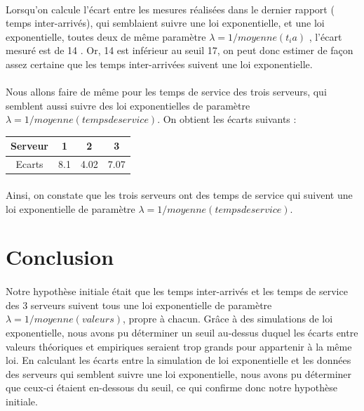 \documentclass{article}
\begin{document}
\paragraph{}
Lorsqu’on calcule l’écart entre les mesures réalisées dans le dernier rapport ( temps inter-arrivés), qui semblaient suivre une loi exponentielle,  et une loi exponentielle, toutes deux de même paramètre $ \lambda = 1/moyenne(t_ia)$ , l’écart mesuré est de 14 . Or, 14 est inférieur au seuil 17, on peut donc estimer de façon assez certaine que les temps inter-arrivées suivent une loi exponentielle.

\paragraph{}
Nous allons faire de même pour les temps de service des trois serveurs, qui semblent aussi suivre des loi exponentielles de paramètre
 $\lambda = 1/moyenne(temps de service)$. On obtient les écarts suivants :
\begin{center}
\begin{tabular}{cccc}
Serveur & 1 & 2 & 3 \\
\hline
Ecarts & 8.1 & 4.02 & 7.07 \\
\hline
\end{tabular}
\end{center}
\paragraph{}
Ainsi, on constate que les trois serveurs ont des temps de service qui suivent une loi exponentielle de paramètre $\lambda= 1/moyenne(temps de service)$.
\section{Conclusion}
\paragraph{}
Notre hypothèse initiale était que les temps inter-arrivés et les temps de service des 3 serveurs suivent tous une loi exponentielle de paramètre $\lambda=1/moyenne(valeurs)$, propre à chacun. Grâce à des simulations de loi exponentielle, nous avons pu déterminer un seuil au-dessus duquel les écarts entre valeurs théoriques et empiriques seraient trop grands pour appartenir à la même loi.  En calculant les écarts entre la simulation de loi exponentielle et les données des serveurs qui semblent suivre une loi exponentielle, nous avons pu déterminer que ceux-ci étaient en-dessous du seuil, ce qui confirme donc notre hypothèse initiale.
\end{document}
